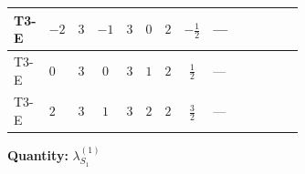 \documentclass[8pt]{article}
\begin{document}
\begin{landscape}
\begin{longtable}{@{}llcccccc >{\raggedright\arraybackslash}p{0.21\linewidth} >{\raggedright\arraybackslash}p{0.21\linewidth} >{\raggedright\arraybackslash}p{0.21\linewidth}@{}}
\midrule
T3-E & $-2$ & $3$ & $-1$ & $3$ & $0$ & $2$ & $-\frac{1}{2}$ & --- & \scriptsize\adjustbox{max width=\linewidth}{$\begin{gathered} {\lambda_{S_1}^{(1)}} (4 T_{\nu}^{(1)}+14 {\lambda_{S_1}^{(A)}})\end{gathered}$} & \scriptsize\adjustbox{max width=\linewidth}{$\begin{gathered} +2 {\lambda_{S_1}^{(A)}} T_{\nu}^{(1)}\end{gathered}$} \\
\midrule
T3-E & $0$ & $3$ & $0$ & $3$ & $1$ & $2$ & $\frac{1}{2}$ & --- & \scriptsize\adjustbox{max width=\linewidth}{$\begin{gathered} {\lambda_{S_1}^{(1)}} (4 T_{\nu}^{(1)}+14 {\lambda_{S_1}^{(A)}})\end{gathered}$} & \scriptsize\adjustbox{max width=\linewidth}{$\begin{gathered} +2 {\lambda_{S_1}^{(A)}} T_{\nu}^{(1)}\end{gathered}$} \\
\midrule
T3-E & $2$ & $3$ & $1$ & $3$ & $2$ & $2$ & $\frac{3}{2}$ & --- & \scriptsize\adjustbox{max width=\linewidth}{$\begin{gathered} {\lambda_{S_1}^{(1)}} (4 T_{\nu}^{(1)}+14 {\lambda_{S_1}^{(A)}})\end{gathered}$} & \scriptsize\adjustbox{max width=\linewidth}{$\begin{gathered} +2 {\lambda_{S_1}^{(A)}} T_{\nu}^{(1)}\end{gathered}$} \\
\midrule
\bottomrule
\end{longtable}
\clearpage
\noindent\textbf{Quantity: }$\lambda_{S_1}^{(1)}$\par\smallskip

\end{landscape}
\end{document}
